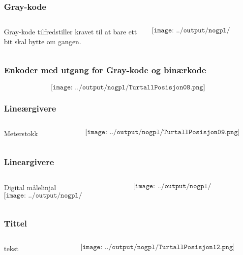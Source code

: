 \documentclass[aspectratio=169,xcolor=dvipsnames]{beamer}
\begin{document}
\begin{frame}
	\frametitle{Gray-kode}
	\begin{columns}
		\begin{column}{0.5\textwidth}
Gray-kode tilfredstiller kravet til at bare ett bit skal bytte om gangen. 
			
		\end{column}

		\begin{column}{0.5\textwidth}
	$$\texttt{[image: ../output/nogpl/TurtallPosisjon07.png]}$$
		\end{column}
	\end{columns}
\end{frame}

\begin{frame}
	\frametitle{Enkoder med utgang for Gray-kode og binærkode}
	$$\texttt{[image: ../output/nogpl/TurtallPosisjon08.png]}$$
\end{frame}

\begin{frame}
	\frametitle{Lineærgivere}
	\begin{columns}
		\begin{column}{0.5\textwidth}
Meterstokk
			
		\end{column}

		\begin{column}{0.5\textwidth}
	$$\texttt{[image: ../output/nogpl/TurtallPosisjon09.png]}$$
		\end{column}
	\end{columns}
\end{frame}

\begin{frame}
	\frametitle{Lineargivere}
	\begin{columns}
		\begin{column}{0.5\textwidth}
Digital målelinjal
	$$\texttt{[image: ../output/nogpl/TurtallPosisjon10.png]}$$
			
		\end{column}

		\begin{column}{0.5\textwidth}
	$$\texttt{[image: ../output/nogpl/TurtallPosisjon11.png]}$$
		\end{column}
	\end{columns}
\end{frame}


\begin{frame}
	\frametitle{Tittel}
	\begin{columns}
		\begin{column}{0.5\textwidth}
tekst
			
		\end{column}

		\begin{column}{0.5\textwidth}
	$$\texttt{[image: ../output/nogpl/TurtallPosisjon12.png]}$$
		\end{column}
	\end{columns}
\end{frame}
\end{document}
